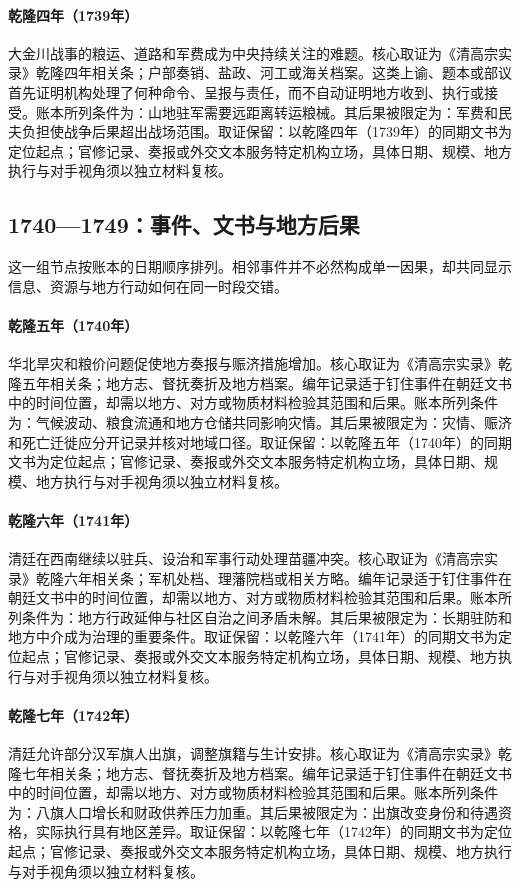\hypertarget{ledger:EQ-1739-JINCHUAN-SUPPLY}{}\paragraph{乾隆四年（1739年）}大金川战事的粮运、道路和军费成为中央持续关注的难题。核心取证为《清高宗实录》乾隆四年相关条；户部奏销、盐政、河工或海关档案。这类上谕、题本或部议首先证明机构处理了何种命令、呈报与责任，而不自动证明地方收到、执行或接受。账本所列条件为：山地驻军需要远距离转运粮械。其后果被限定为：军费和民夫负担使战争后果超出战场范围。取证保留：以乾隆四年（1739年）的同期文书为定位起点；官修记录、奏报或外交文本服务特定机构立场，具体日期、规模、地方执行与对手视角须以独立材料复核。
\subsection{1740—1749：事件、文书与地方后果}
这一组节点按账本的日期顺序排列。相邻事件并不必然构成单一因果，却共同显示信息、资源与地方行动如何在同一时段交错。
\hypertarget{ledger:EQ-1740-NORTH-CHINA-FAMINE}{}\paragraph{乾隆五年（1740年）}华北旱灾和粮价问题促使地方奏报与赈济措施增加。核心取证为《清高宗实录》乾隆五年相关条；地方志、督抚奏折及地方档案。编年记录适于钉住事件在朝廷文书中的时间位置，却需以地方、对方或物质材料检验其范围和后果。账本所列条件为：气候波动、粮食流通和地方仓储共同影响灾情。其后果被限定为：灾情、赈济和死亡迁徙应分开记录并核对地域口径。取证保留：以乾隆五年（1740年）的同期文书为定位起点；官修记录、奏报或外交文本服务特定机构立场，具体日期、规模、地方执行与对手视角须以独立材料复核。
\hypertarget{ledger:EQ-1741-MIAO-FRONTIER-CAMPAIGN}{}\paragraph{乾隆六年（1741年）}清廷在西南继续以驻兵、设治和军事行动处理苗疆冲突。核心取证为《清高宗实录》乾隆六年相关条；军机处档、理藩院档或相关方略。编年记录适于钉住事件在朝廷文书中的时间位置，却需以地方、对方或物质材料检验其范围和后果。账本所列条件为：地方行政延伸与社区自治之间矛盾未解。其后果被限定为：长期驻防和地方中介成为治理的重要条件。取证保留：以乾隆六年（1741年）的同期文书为定位起点；官修记录、奏报或外交文本服务特定机构立场，具体日期、规模、地方执行与对手视角须以独立材料复核。
\hypertarget{ledger:EQ-1742-BANNER-EXIT-ORDER}{}\paragraph{乾隆七年（1742年）}清廷允许部分汉军旗人出旗，调整旗籍与生计安排。核心取证为《清高宗实录》乾隆七年相关条；地方志、督抚奏折及地方档案。编年记录适于钉住事件在朝廷文书中的时间位置，却需以地方、对方或物质材料检验其范围和后果。账本所列条件为：八旗人口增长和财政供养压力加重。其后果被限定为：出旗改变身份和待遇资格，实际执行具有地区差异。取证保留：以乾隆七年（1742年）的同期文书为定位起点；官修记录、奏报或外交文本服务特定机构立场，具体日期、规模、地方执行与对手视角须以独立材料复核。
